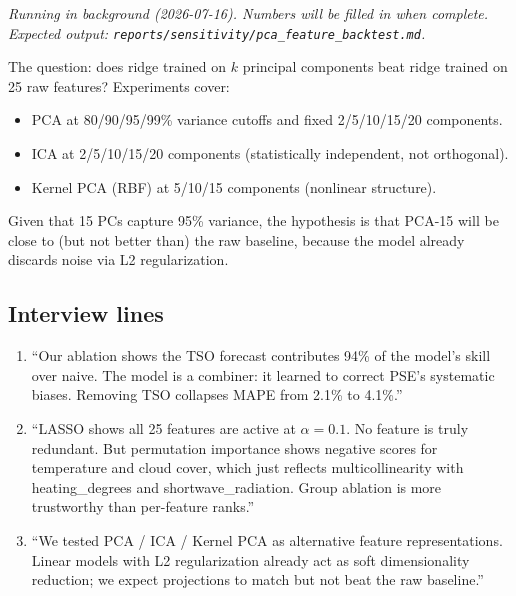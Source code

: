 \textit{Running in background (2026-07-16). Numbers will be filled in when
complete. Expected output: \texttt{reports/sensitivity/pca\_feature\_backtest.md}.}

The question: does ridge trained on $k$ principal components beat ridge trained
on 25 raw features? Experiments cover:
\begin{itemize}
  \item PCA at 80/90/95/99\% variance cutoffs and fixed 2/5/10/15/20 components.
  \item ICA at 2/5/10/15/20 components (statistically independent, not
        orthogonal).
  \item Kernel PCA (RBF) at 5/10/15 components (nonlinear structure).
\end{itemize}

Given that 15 PCs capture 95\% variance, the hypothesis is that PCA-15 will
be close to (but not better than) the raw baseline, because the model already
discards noise via L2 regularization.

\subsection{Interview lines}

\begin{enumerate}
  \item ``Our ablation shows the TSO forecast contributes 94\% of the model's
        skill over naive. The model is a combiner: it learned to correct PSE's
        systematic biases. Removing TSO collapses MAPE from 2.1\% to 4.1\%.''

  \item ``LASSO shows all 25 features are active at $\alpha=0.1$. No feature is
        truly redundant. But permutation importance shows negative scores for
        temperature and cloud cover, which just reflects multicollinearity with
        heating\_degrees and shortwave\_radiation. Group ablation is more
        trustworthy than per-feature ranks.''

  \item ``We tested PCA / ICA / Kernel PCA as alternative feature representations.
        Linear models with L2 regularization already act as soft dimensionality
        reduction; we expect projections to match but not beat the raw baseline.''
\end{enumerate}
